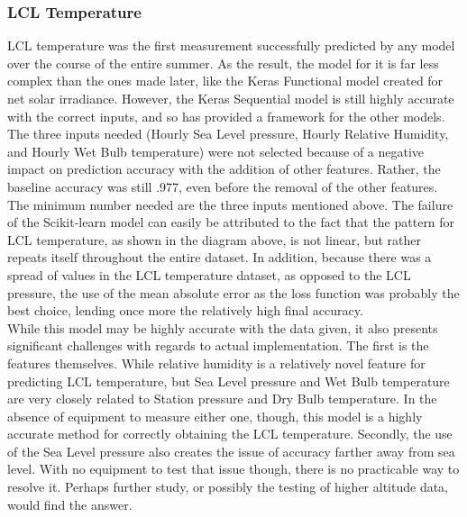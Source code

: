 \documentclass[conference]{IEEEtran}
\begin{document}
\subsubsection{LCL Temperature}
LCL temperature was the first measurement successfully predicted by any model over the course of the entire summer. As the result, the model for it is far less complex than the ones made later, like the Keras Functional model created for net 
solar irradiance. However, the Keras Sequential model is still highly accurate with the correct inputs, and so has provided a framework for the other models. The three inputs needed (Hourly Sea Level pressure, Hourly Relative Humidity, and Hourly Wet Bulb temperature) were not selected because of a negative impact on prediction accuracy with the addition of other features. Rather, the baseline accuracy was still .977, even before the removal of the other features. The minimum number needed are the three inputs mentioned above.  The failure of the Scikit-learn model can easily be attributed to the fact that the pattern for LCL temperature, as shown in the diagram above, is not linear, but rather repeats itself throughout the entire 
dataset. In addition, because there was a spread of values in the LCL temperature dataset, as opposed to the LCL pressure, the use of the mean absolute error as the loss function was probably the best choice, lending once more the relatively high final accuracy.\\
While this model may be highly accurate with the data given, it also presents significant challenges with regards to actual implementation. The first is the features themselves. While relative humidity is a relatively novel feature for predicting LCL
temperature, but Sea Level pressure and Wet Bulb temperature are very closely related to Station pressure and Dry Bulb temperature. In the absence of equipment to measure either one, though, this model is a highly accurate method for
correctly obtaining the LCL temperature. Secondly, the use of the Sea Level pressure also creates the issue of accuracy farther away from sea level. With no equipment to test that issue though, there is no practicable way to resolve it. Perhaps further study, or possibly the testing of higher altitude data, would find the answer.
\end{document}

